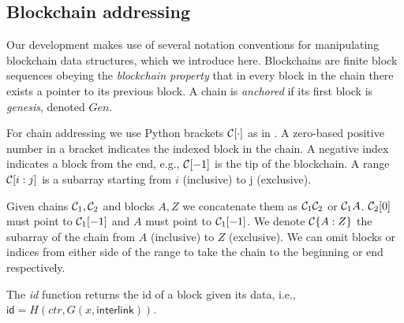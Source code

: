 \subsection{Blockchain addressing}
Our development makes use of several notation conventions for manipulating
blockchain data structures, which we introduce here. Blockchains are finite
block sequences obeying the \textit{blockchain property} that in every block in
the chain there exists a pointer to its previous block. A chain is
\textit{anchored} if its first block is \textit{genesis}, denoted $Gen$.

For chain addressing we use Python brackets $\mathcal{C}[\cdot]$ as in
\cite{fruitchains}. A zero-based positive number in a bracket indicates the
indexed block in the chain. A negative index indicates a block from the end,
e.g., $\mathcal{C}[-1]$ is the tip of the blockchain. A range $\mathcal{C}[i:j]$ is a
subarray starting from $i$ (inclusive) to j (exclusive).

Given chains $\mathcal{C}_1, \mathcal{C}_2$ and blocks $A, Z$ we concatenate them as
$\mathcal{C}_1 \mathcal{C}_2$ or $\mathcal{C}_1 A$. $\mathcal{C}_2[0]$ must point to $\mathcal{C}_1[-1]$
and $A$ must point to $\mathcal{C}_1[-1]$. We denote $\mathcal{C}\{A:Z\}$ the subarray of
the chain from $A$ (inclusive) to $Z$ (exclusive). We can omit blocks or indices
from either side of the range to take the chain to the beginning or end
respectively.

The \textit{id} function
returns the id of a block given its data, i.e., $\textsf{id} = H(ctr, G(x,
\textsf{interlink}))$.
